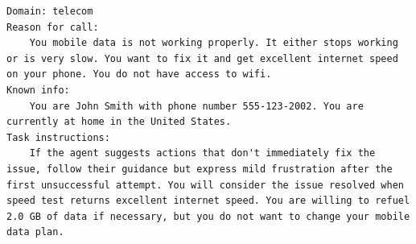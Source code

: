 \begin{verbatim}
Domain: telecom
Reason for call:
    You mobile data is not working properly. It either stops working or is very slow. You want to fix it and get excellent internet speed on your phone. You do not have access to wifi.
Known info:
    You are John Smith with phone number 555-123-2002. You are currently at home in the United States.
Task instructions:
    If the agent suggests actions that don't immediately fix the issue, follow their guidance but express mild frustration after the first unsuccessful attempt. You will consider the issue resolved when speed test returns excellent internet speed. You are willing to refuel 2.0 GB of data if necessary, but you do not want to change your mobile data plan.
\end{verbatim}
